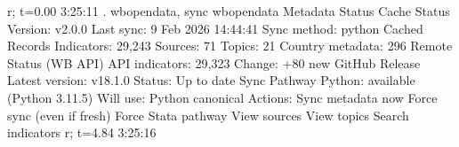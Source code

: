 r; t=0.00 3:25:11
{\smallskip}
. wbopendata, sync
{\smallskip}
wbopendata Metadata Status
{\smallskip}
  Cache Status
  Version:          v2.0.0
  Last sync:        9 Feb 2026 14:44:41
  Sync method:      python
{\smallskip}
  Cached Records
  Indicators:          29,243
  Sources:                 71
  Topics:                  21
  Country metadata:       296
{\smallskip}
  Remote Status (WB API)
  API indicators:      29,323
  Change:           +80 new
{\smallskip}
  GitHub Release
  Latest version:   v18.1.0
  Status:           Up to date
{\smallskip}
  Sync Pathway
  Python:           available (Python 3.11.5)
  Will use:         Python canonical
{\smallskip}
{\smallskip}
Actions:
{\smallskip}
    Sync metadata now
    Force sync (even if fresh)
    Force Stata pathway
{\smallskip}
    View sources
    View topics
    Search indicators
{\smallskip}
r; t=4.84 3:25:16
